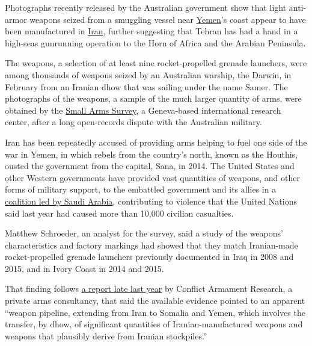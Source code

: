Photographs recently released by the Australian government show that
light anti-armor weapons seized from a smuggling vessel near
\href{https://www.nytimes.com/topic/destination/yemen?8qa}{Yemen}'s
coast appear to have been manufactured in
\href{https://www.nytimes.com/topic/destination/iran?8qa}{Iran}, further
suggesting that Tehran has had a hand in a high-seas gunrunning
operation to the Horn of Africa and the Arabian Peninsula.

The weapons, a selection of at least nine rocket-propelled grenade
launchers, were among thousands of weapons seized by an Australian
warship, the Darwin, in February from an Iranian dhow that was sailing
under the name Samer. The photographs of the weapons, a sample of the
much larger quantity of arms, were obtained by the
\href{http://www.smallarmssurvey.org/}{Small Arms Survey}, a
Geneva-based international research center, after a long open-records
dispute with the Australian military.

Iran has been repeatedly accused of providing arms helping to fuel one
side of the war in Yemen, in which rebels from the country's north,
known as the Houthis, ousted the government from the capital, Sana, in
2014. The United States and other Western governments have provided vast
quantities of weapons, and other forms of military support, to the
embattled government and its allies in a
\href{https://www.nytimes.com/2016/10/10/world/middleeast/yemen-saudi-arabia-military.html?action=click\&contentCollection=Middle\%20East\&module=RelatedCoverage\&region=Marginalia\&pgtype=article}{coalition
led by Saudi Arabia}, contributing to violence that the United Nations
said last year had caused more than 10,000 civilian casualties.

Matthew Schroeder, an analyst for the survey, said a study of the
weapons' characteristics and factory markings had showed that they match
Iranian-made rocket-propelled grenade launchers previously documented in
Iraq in 2008 and 2015, and in Ivory Coast in 2014 and 2015.

That finding follows
\href{https://www.washingtonpost.com/news/checkpoint/wp/2016/11/30/how-iranian-weapons-are-ending-up-in-yemen/?utm_term=.f5126d97f1e7}{a
report late last year} by Conflict Armament Research, a private arms
consultancy, that said the available evidence pointed to an apparent
``weapon pipeline, extending from Iran to Somalia and Yemen, which
involves the transfer, by dhow, of significant quantities of
Iranian-manufactured weapons and weapons that plausibly derive from
Iranian stockpiles.''

